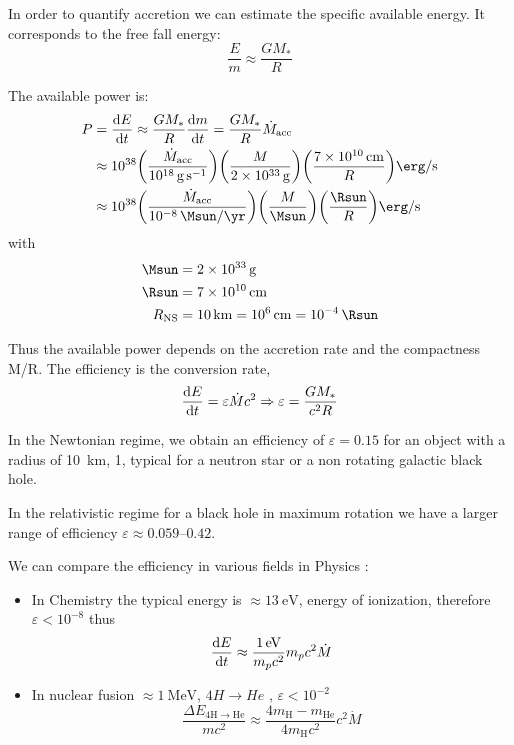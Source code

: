 \documentclass[10pt,a4paper,english]{article}
\let\originalleft\left
\let\originalright\right
\renewcommand{\left}{\mathopen{}\mathclose\bgroup\originalleft}
\renewcommand{\right}{\aftergroup\egroup\originalright}
\begin{document}
In order to quantify accretion we can estimate the specific available energy.
It corresponds to the free fall energy:
\begin{equation*}
    \frac{E}{m} \approx \frac{GM_*}{R}
\end{equation*}

The available power is:
\begin{align*}
    P & = \frac{\d{E}}{\d{t}} \approx \frac{GM_*}{R} \frac{\d{m}}{\d{t}} = \frac{GM_*}{R} \dot{M}_\mathrm{acc} \\
      & \approx \num{e38} \left(\frac{\dot{M}_\mathrm{acc}}{\SI{e18}{\g\per\s}}\right) \left(\frac{M}{\SI{2e33}{\g}}\right) \left(\frac{\SI{7e10}{\cm}}{R}\right) \si{\erg\per\s} \\
      & \approx \num{e38} \left(\frac{\dot{M}_\mathrm{acc}}{\SI{e-8}{\Msun\per\yr}}\right) \left(\frac{M}{\si{\Msun}}\right) \left(\frac{\si{\Rsun}}{R}\right) \si{\erg\per\s}
\end{align*}
with
\begin{align*}
    \si{\Msun} &= \SI{2e33}{\g} \\
    \si{\Rsun} &= \SI{7e10}{\cm} \\
    R_\mathrm{NS}   &= \SI{10}{\km} = \SI{e6}{\cm} = \SI{e-4}{\Rsun}
\end{align*}

Thus the available power depends on the accretion rate and the compactness M/R.
The efficiency is the conversion rate,
\begin{equation*}
    \frac{\mathrm{d}{E}}{\mathrm{d}{t}} = \varepsilon \dot{M} c^{2} \Rightarrow \varepsilon = \frac{GM_*}{c^{2}R}
\end{equation*}

In the Newtonian regime, we obtain an efficiency of $\varepsilon = 0.15$ for an
object with a radius of \SI{10}{km}, \SI{1}{\Msun}, typical for a neutron star
or a non rotating galactic black hole.

In the relativistic regime for a black hole in maximum rotation we have a
larger range of efficiency $\varepsilon \approx \numrange{0.059}{0.42}$.

We can compare the efficiency in various fields in Physics :
\begin{itemize}
    \item In Chemistry the typical energy is $\approx \SI{13}{\electronvolt}$,
          energy of ionization, therefore $\varepsilon < 10^{-8}$ thus
          \begin{equation*}
              \frac{\mathrm{d}{E}}{\mathrm{d}{t}} \approx \frac{\SI{1}{\electronvolt}}{m_p c^2} m_p c^2 \dot{M}
          \end{equation*}
    \item In nuclear fusion $\approx \SI{1}{\mega\electronvolt}$, $4H \rightarrow He$ , $\varepsilon < 10^{-2}$
          \begin{equation*}
              \frac{\Delta E_{4 \mathrm{H} \rightarrow \mathrm{He}}}{m c^2} \approx \frac{4 m_\mathrm{H} - m_\mathrm{He}}{4 m_\mathrm{H} c^2} c^2 \dot{M}
          \end{equation*}
\end{itemize}
\end{document}

